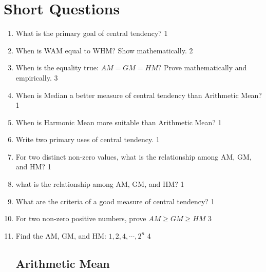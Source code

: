 \documentclass[a4paper,oneside]{book}
\begin{document}
\section{Short Questions}

\begin{enumerate}

\subsection{General Questions}

    \item What is the primary goal of central tendency? \hfill 1
    \item When is WAM equal to WHM? Show mathematically. \hfill 2
    \item When is the equality true: $AM=GM=HM$? Prove mathematically and empirically.  \hfill 3
    \item When is Median a better measure of central tendency than Arithmetic Mean?  \hfill 1
    \item When is Harmonic Mean more suitable than Arithmetic Mean?  \hfill 1
    \item Write two primary uses of central tendency. \hfill 1
    \item For two distinct non-zero values, what is the relationship among AM, GM, and HM? \hfill 1
    \item what is the relationship among AM, GM, and HM? \hfill 1
    \item What are the criteria of a good measure of central tendency? \hfill 1
    \item For two non-zero positive numbers, prove $AM \ge GM \ge HM$ \hfill 3
    \item Find the AM, GM, and HM: $1,2,4,\cdots, 2^n$ \hfill 4

    
\subsection{Arithmetic Mean}


\end{enumerate}
\end{document}
